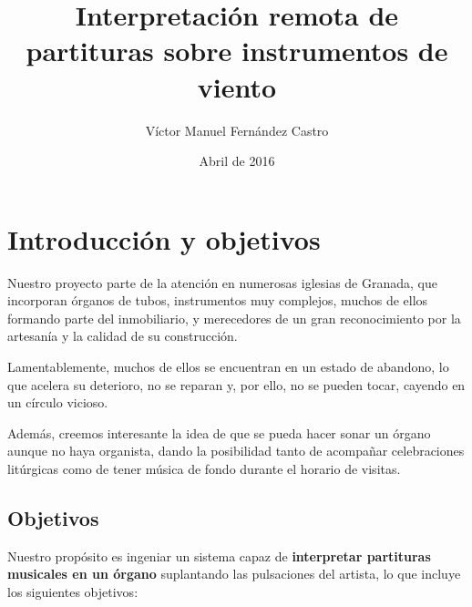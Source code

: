 \documentclass[10pt,a4paper]{article}
\title{Interpretación remota de partituras sobre instrumentos de viento}
\author{Víctor Manuel Fernández Castro}
\date{Abril de 2016}
\begin{document}
	
	
	\maketitle
	\thispagestyle{empty}
	
	
	\newpage
	\tableofcontents
	\listoffigures
	
	
	\newpage
	\pagestyle{fancy}
	\section{Introducción y objetivos}
	
	Nuestro proyecto parte de la atención en numerosas iglesias de Granada, que
	incorporan órganos de tubos, instrumentos muy complejos, muchos de ellos
	formando parte del inmobiliario, y merecedores de un gran reconocimiento por
	la artesanía y la calidad de su construcción.
	
	Lamentablemente, muchos de ellos se encuentran en un estado de abandono, lo
	que acelera su deterioro, no se reparan y, por ello, no se pueden tocar,
	cayendo en un círculo vicioso.
	
	Además, creemos interesante la idea de que se pueda hacer sonar un órgano
	aunque no haya organista, dando la posibilidad tanto de acompañar
	celebraciones litúrgicas como de tener música de fondo durante el horario de
	visitas.
	
	\subsection{Objetivos}
	
	Nuestro propósito es ingeniar un sistema capaz de \textbf{interpretar
	partituras musicales en un órgano} suplantando las pulsaciones del artista,
	lo que incluye los siguientes objetivos:
	
\end{document}
